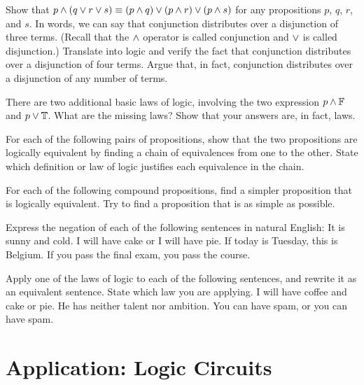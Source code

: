 \begin{exercises}
\problem Show that $p\wedge(q\vee r\vee s)\equiv (p\wedge q)\vee(p\wedge r)\vee
(p\wedge s)$ for any propositions $p$, $q$, $r$, and $s$.  In words, 
we can say that conjunction distributes over a disjunction of
three terms.  (Recall that the $\wedge$ operator is called conjunction and $\vee$
is called disjunction.)
Translate into logic and verify the fact that
conjunction distributes over a disjunction of four terms.  Argue that,
in fact, conjunction distributes over a disjunction of any number
of terms.

\problem There are two additional basic laws of logic, involving the
two expression $p\wedge\mathbb{F}$ and $p\vee\mathbb{T}$.  What are the missing laws?
Show that your answers are, in fact, laws.

\problem For each of the following pairs of propositions, show that
the two propositions are logically equivalent by finding a chain of
equivalences from one to the other.
State which definition or law of logic justifies each equivalence in the chain.

\problem For each of the following compound propositions, find a 
simpler proposition that is logically equivalent.  Try to find a proposition
that is as simple as possible.

\problem Express the negation of each of the following sentences in
natural English:
\ppart It is sunny and cold.
\ppart I will have cake or I will have pie.
\ppart If today is Tuesday, this is Belgium.
\ppart If you pass the final exam, you pass the course.

\problem Apply one of the laws of logic to each of the
following sentences, and rewrite it as an equivalent sentence.
State which law you are applying.
\ppart I will have coffee and cake or pie.
\ppart He has neither talent nor ambition.
\ppart You can have spam, or you can have spam.

\end{exercises}





\section{Application: Logic Circuits}\label{S-logic-3}

